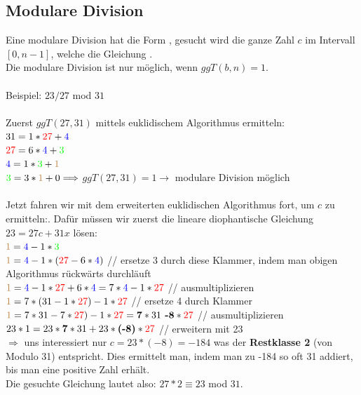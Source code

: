 \documentclass[10pt]{article}
\begin{document}
\subsection{Modulare Division}
Eine modulare Division hat die Form  , gesucht wird die ganze Zahl $c$ im Intervall $[0,n-1]$, welche die Gleichung  .\\
Die modulare Division ist nur möglich, wenn $ggT(b,n)=1$.
\\\\
Beispiel: $23/27$ mod $31$
\\\\
Zuerst $ggT(27,31)$ mittels euklidischem Algorithmus ermitteln:\\
$31 = 1 * {\color{red}27} + {\color{blue}4}$\\
${\color{red}27} = 6 * {\color{blue}4} + {\color{green}3}$ \\
${\color{blue}4} = 1 * {\color{green}3} + {\color{brown}1}$\\
${\color{green}3} = 3 * {\color{brown}1} + 0 \Longrightarrow$ $ggT(27,31) = 1 \rightarrow$  modulare Division möglich \\
\\
Jetzt fahren wir mit dem erweiterten euklidischen Algorithmus fort, um $c$ zu ermitteln:. Dafür müssen wir zuerst die lineare diophantische Gleichung $23 = 27c + 31x$ lösen:\\

${\color{brown}1} = {\color{blue}4} - 1 * {\color{green}3}$\\
${\color{brown}1} = {\color{blue}4} - 1 * ({\color{red}27} - 6 * {\color{blue}4})$  {\color{gray}// ersetze $3$ durch diese Klammer, indem man obigen Algorithmus rückwärts durchläuft}\\
${\color{brown}1} = {\color{blue}4} - 1 * {\color{red}27} + 6 * {\color{blue}4} = 7 * {\color{blue}4} - 1 * {\color{red}27}$  {\color{gray}// ausmultiplizieren}\\
${\color{brown}1} = 7 * (31 - 1 * {\color{red}27}) - 1 * {\color{red}27}$  {\color{gray}// ersetze {\color{blue}4} durch Klammer}\\
${\color{brown}1} = 7 * 31 - 7 * {\color{red}27}) - 1 * {\color{red}27} = \textbf{7} * 31 \textbf{ -8} * {\color{red}27}$  {\color{gray}// ausmultiplizieren}\\
$23 * 1 = 23 * \textbf{7} * 31 + 23 * \textbf{(-8)} * {\color{red}27}$  {\color{gray}// erweitern mit 23}\\
$\Longrightarrow$ uns interessiert nur $c = 23 * (-8) = -184$ was der \textbf{Restklasse 2} (von Modulo 31) entspricht. Dies ermittelt man, indem man zu -184 so oft 31 addiert, bis man eine positive Zahl erhält.\\
Die gesuchte Gleichung lautet also: $27 * 2 \equiv 23$ mod $31$.
\end{document}

